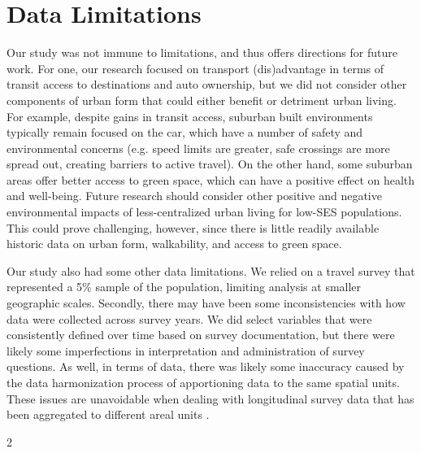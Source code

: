 \section{Data Limitations}

Our study was not immune to limitations, and thus offers directions for future work. For one, our research focused on transport (dis)advantage in terms of transit access to destinations and auto ownership, but we did not consider other components of urban form that could either benefit or detriment urban living. For example, despite gains in transit access, suburban built environments typically remain focused on the car, which have a number of safety and environmental concerns (e.g. speed limits are greater, safe crossings are more spread out, creating barriers to active travel). On the other hand, some suburban areas offer better access to green space, which can have a positive effect on health and well-being. Future research should consider other positive and negative environmental impacts of less-centralized urban living for low-SES populations. This could prove challenging, however, since there is little readily available historic data on urban form, walkability, and access to green space.

Our study also had some other data limitations. We relied on a travel survey that represented a 5\% sample of the population, limiting analysis at smaller geographic scales. Secondly, there may have been some inconsistencies with how data were collected across survey years. We did select variables that were consistently defined over time based on survey documentation, but there were likely some imperfections in interpretation and administration of survey questions. As well, in terms of data, there was likely some inaccuracy caused by the data harmonization process of apportioning data to the same spatial units. These issues are unavoidable when dealing with longitudinal survey data that has been aggregated to different areal units \cite{allen_new_2018}. 

2

